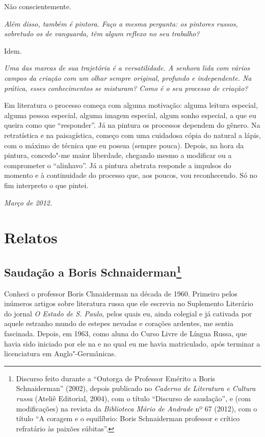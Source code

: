 Não conscientemente.

\medskip

\emph{Além disso, também é pintora. Faço a mesma pergunta: os pintores
russos, sobretudo os de vanguarda, têm algum reflexo no seu trabalho?}

Idem.

\medskip

\emph{Uma das marcas de sua trajetória é a versatilidade. A senhora lida
com vários campos da criação com um olhar sempre original, profundo e
independente. Na prática, esses conhecimentos se misturam? Como é o seu
processo de criação?}

Em literatura o processo começa com alguma motivação: alguma leitura
especial, alguma pessoa especial, alguma imagem especial, algum sonho
especial, a que eu queira como que ``responder''. Já na pintura os
processos dependem do gênero. Na retratística e na paisagística, começo
com uma cuidadosa cópia do natural a lápis, com o máximo de técnica que
eu possua (sempre pouca). Depois, na hora da pintura, concedo"-me maior
liberdade, chegando mesmo a modificar ou a comprometer o ``alinhavo''.
Já a pintura abstrata responde a impulsos do momento e à continuidade do
processo que, aos poucos, vou reconhecendo. Só no fim interpreto o que
pintei.

\begin{flushright}
\emph{Março de 2012.}
\end{flushright}

\part{Relatos}

\chapter{Saudação a Boris Schnaiderman\footnote{Discurso feito durante a
  ``Outorga de Professor Emérito a Boris Schnaiderman'' (2002), depois
  publicado no \emph{Caderno de Literatura e Cultura russa} (Ateliê
  Editorial, 2004), com o título ``Discurso de saudação'', e (com
 modificações) na revista da \emph{Biblioteca Mário de
  Andrade} nº 67 (2012), com o título ``A coragem e o equilíbrio: Boris
  Schnaiderman professor e crítico refratário às paixões súbitas''.}}
\label{boris}

Conheci o professor Boris Chnaiderman na década de 1960. Primeiro pelos
inúmeros artigos sobre literatura russa que ele escrevia no Suplemento
Literário do jornal \emph{O Estado de S. Paulo}, pelos quais eu, ainda
colegial e já cativada por aquele estranho mundo de estepes nevadas e
corações ardentes, me sentia fascinada. Depois, em 1963, como aluna do
Curso Livre de Língua Russa, que havia sido iniciado por ele na  e no
qual eu me havia matriculado, após terminar a licenciatura em
Anglo"-Germânicas.


